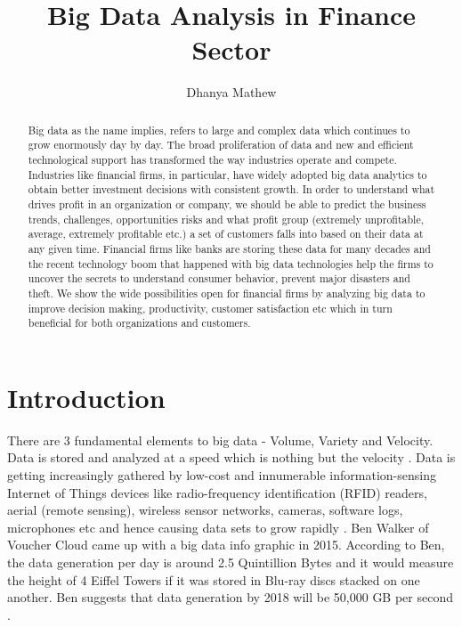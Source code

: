 \documentclass[sigconf]{acmart}
\begin{document}
\title{Big Data Analysis in Finance Sector}


\author{Dhanya Mathew}

\renewcommand{\shortauthors}{B. Trovato et al.}


\begin{abstract}

Big data as the name implies, refers to large and complex data which continues to grow enormously day by day. The broad proliferation of data and new and efficient technological support has transformed the way industries operate and compete. Industries like financial firms, in particular, have widely adopted big data analytics to obtain better investment decisions with consistent growth. In order to understand what drives profit in an organization or company, we should be able to predict the business trends, challenges, opportunities risks and what profit group (extremely unprofitable, average, extremely profitable etc.) a set of customers falls into based on their data at any given time. Financial firms like banks are storing these data for many decades and the recent technology boom that happened with big data technologies help the firms to uncover the secrets to understand consumer behavior, prevent major disasters and theft. We show the wide possibilities open for financial firms by analyzing big data to improve decision making, productivity, customer satisfaction etc which in turn beneficial for both organizations and customers.
\end{abstract}



\maketitle

\section{Introduction}

There are 3 fundamental elements to big data - Volume, Variety and Velocity. Data is stored and analyzed at a speed which is nothing but the velocity \cite{how-big-data-has-changed-finance}. Data is getting increasingly gathered by low-cost and innumerable information-sensing Internet of Things devices like radio-frequency identification (RFID) readers, aerial (remote sensing), wireless sensor networks, cameras, software logs, microphones etc and hence causing data sets to grow rapidly \cite{wiki-bigdata}. Ben Walker of Voucher Cloud came up with a big data info graphic in 2015. According to Ben, the data generation per day is around 2.5 Quintillion Bytes and it would measure the height of 4 Eiffel Towers if it was stored in Blu-ray discs stacked on one another. Ben suggests that data generation by 2018 will be 50,000 GB per second \cite{how-much-data-is-created-daily}. 
\end{document}
